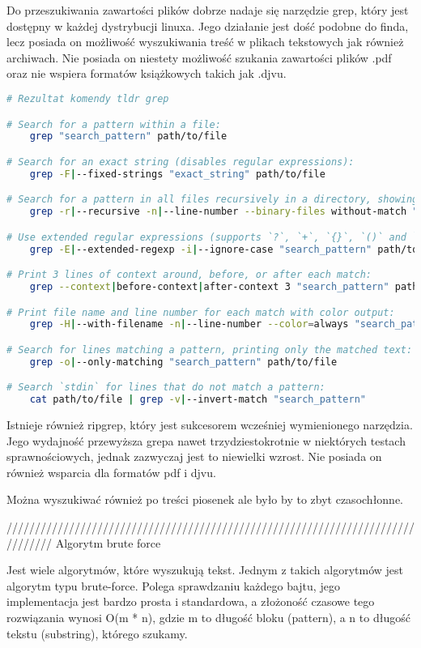 Do przeszukiwania zawartości plików dobrze nadaje się narzędzie grep, który jest
dostępny w każdej dystrybucji linuxa. Jego działanie jest dość podobne do finda,
lecz posiada on możliwość wyszukiwania treść w plikach tekstowych jak również
archiwach. Nie posiada on niestety możliwość szukania zawartości plików .pdf oraz
nie wspiera formatów książkowych takich jak .djvu.
\begin{lstlisting}[language=bash]
# Rezultat komendy tldr grep 

# Search for a pattern within a file:
    grep "search_pattern" path/to/file

# Search for an exact string (disables regular expressions):
    grep -F|--fixed-strings "exact_string" path/to/file

# Search for a pattern in all files recursively in a directory, showing line numbers of matches, ignoring binary files:
    grep -r|--recursive -n|--line-number --binary-files without-match "search_pattern" path/to/directory

# Use extended regular expressions (supports `?`, `+`, `{}`, `()` and `|`), in case-insensitive mode:
    grep -E|--extended-regexp -i|--ignore-case "search_pattern" path/to/file

# Print 3 lines of context around, before, or after each match:
    grep --context|before-context|after-context 3 "search_pattern" path/to/file

# Print file name and line number for each match with color output:
    grep -H|--with-filename -n|--line-number --color=always "search_pattern" path/to/file

# Search for lines matching a pattern, printing only the matched text:
    grep -o|--only-matching "search_pattern" path/to/file

# Search `stdin` for lines that do not match a pattern:
    cat path/to/file | grep -v|--invert-match "search_pattern"
\end{lstlisting}
Istnieje również ripgrep, który jest sukcesorem wcześniej wymienionego
narzędzia. Jego wydajność przewyższa grepa nawet trzydziestokrotnie w niektórych testach sprawnościowych,
jednak zazwyczaj jest to niewielki wzrost. Nie posiada on również wsparcia dla formatów pdf i djvu.

Można wyszukiwać również po treści piosenek ale było by to zbyt czasochłonne.

////////////////////////////////////////////////////////////////////////////////
Algorytm brute force

Jest wiele algorytmów, które wyszukują tekst. Jednym z takich algorytmów jest 
algorytm typu brute-force. Polega sprawdzaniu każdego bajtu, jego implementacja
jest bardzo prosta i standardowa, a złożoność czasowe tego rozwiązania wynosi
O(m * n), gdzie m to długość bloku (pattern), a n to długość tekstu (substring),
którego szukamy. 

